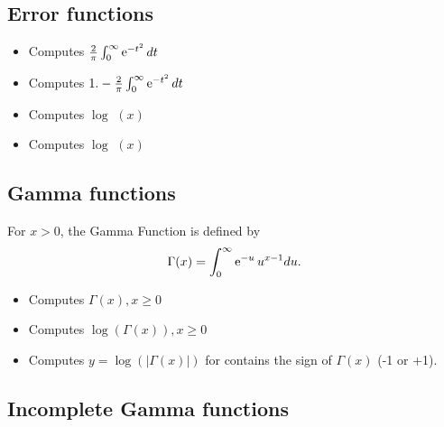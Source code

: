 \subsection{Error functions}

\begin{itemize}
\item {}
  \sshortdescribe Computes $\frac{2}{\pi}\int_0^\infty \operatorname{e}^{ -t^2 } dt$
\item {}
  \sshortdescribe Computes $1. - \frac{2}{\pi}\int_0^\infty \operatorname{e}^{ -t^2 } dt$
\item {}
  \sshortdescribe Computes $\log$ $(x)$
\item {}
  \sshortdescribe Computes $\log$ $(x)$
\end{itemize}

\subsection{Gamma functions}

For $x>0$, the Gamma Function is defined by
\begin{equation*}
  \Gamma(x)=\int_0^{\infty} \operatorname{e}^{ -u } u^{x-1} du.
\end{equation*}

\begin{itemize}
\item {}
  \sshortdescribe   Computes $\Gamma(x), x \geq 0$
\item {}
  \sshortdescribe   Computes $\log(\Gamma(x)), x \geq 0$
\item {}
  \sshortdescribe   Computes $y = \log(|\Gamma(x)|)$ for  
  contains the sign of $\Gamma(x)$ (-1 or +1).
\end{itemize}

\subsection{Incomplete Gamma functions}

